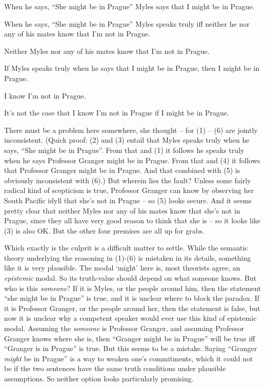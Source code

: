 \documentclass[
  11pt,
  letterpaper,
  DIV=11,
  numbers=noendperiod,
  twoside]{scrartcl}
\providecommand{\tightlist}{%
  \setlength{\itemsep}{0pt}\setlength{\parskip}{0pt}}
\begin{document}
\begin{description}
\tightlist
\item[(1)]
When he says, ``She might be in Prague'' Myles says that I might be in
Prague.
\item[(2)]
When he says, ``She might be in Prague'' Myles speaks truly iff neither
he nor any of his mates know that I'm not in Prague.
\item[(3)]
Neither Myles nor any of his mates know that I'm not in Prague.
\item[(4)]
If Myles speaks truly when he says that I might be in Prague, then I
might be in Prague.
\item[(5)]
I know I'm not in Prague.
\item[(6)]
It's not the case that I know I'm not in Prague if I might be in Prague.
\end{description}

There must be a problem here somewhere, she thought -- for (1) -- (6)
are jointly inconsistent. (Quick proof: (2) and (3) entail that Myles
speaks truly when he says, ``She might be in Prague''. From that and (1)
it follows he speaks truly when he says Professor Granger might be in
Prague. From that and (4) it follows that Professor Granger might be in
Prague. And that combined with (5) is obviously inconsistent with (6).)
But wherein lies the fault? Unless some fairly radical kind of
scepticism is true, Professor Granger can know by observing her South
Pacific idyll that she's not in Prague -- so (5) looks secure. And it
seems pretty clear that neither Myles nor any of his mates know that
she's not in Prague, since they all have very good reason to think that
she is -- so it looks like (3) is also OK. But the other four premises
are all up for grabs.

Which exactly is the culprit is a difficult matter to settle. While the
semantic theory underlying the reasoning in (1)-(6) is mistaken in its
details, something like it is very plausible. The modal `might' here is,
most theorists agree, an \emph{epistemic} modal. So its truth-value
should depend on what someone knows. But who is this \emph{someone}? If
it is Myles, or the people around him, then the statement ``she might be
in Prague'' is true, and it is unclear where to block the paradox. If it
is Professor Granger, or the people around her, then the statement is
false, but now it is unclear why a competent speaker would ever use this
kind of epistemic modal. Assuming the \emph{someone} is Professor
Granger, and assuming Professor Granger knows where she is, then
``Granger might be in Prague'' will be true iff ``Granger is in Prague''
is true. But this seems to be a mistake. Saying ``Granger \emph{might}
be in Prague'' is a way to weaken one's commitments, which it could not
be if the two sentences have the same truth conditions under plausible
assumptions. So neither option looks particularly promising.
\end{document}
